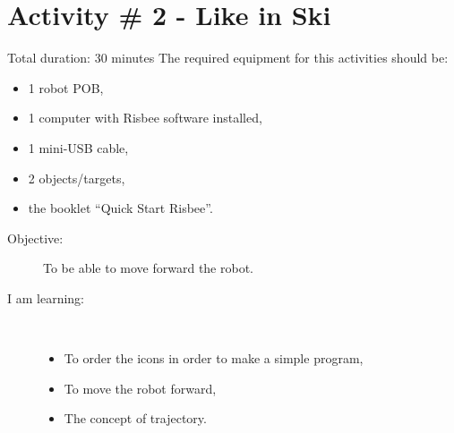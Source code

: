 \section{Activity \# 2 - Like in Ski}


Total duration: 30 minutes
The required equipment for this activities should be:
\begin{itemize}
\item 1 robot POB,
\item 1 computer with Risbee software installed,
\item 1 mini-USB cable,
\item 2 objects/targets,
\item the booklet ``Quick Start Risbee''.
\end{itemize}
\frameboxend

\begin{description}
\item[Objective:] To be able to move forward the robot.
\item[I am learning:] \hfill \\ \vspace{-4ex}
  \begin{itemize}
  \item To order the icons in order to make a simple program,
  \item To move the robot forward,
  \item The concept of trajectory.
  \end{itemize}
\end{description}
\frameboxend

